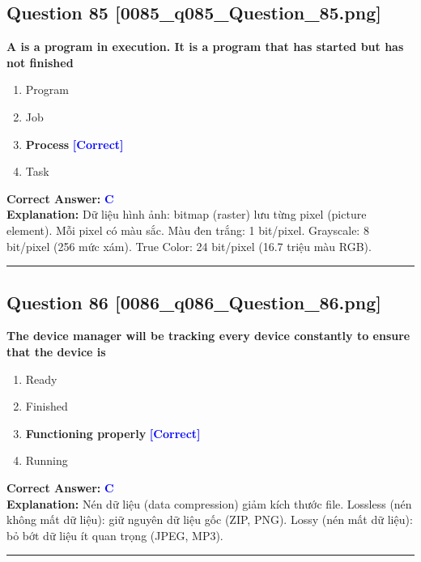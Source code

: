 \documentclass[11pt,a4paper]{article}
\begin{document}
\begin{minipage}{\textwidth}
\subsection*{Question 85 \quad \footnotesize{[0085\_q085\_Question\_85.png]}}
\noindent \textbf{A is a program in execution. It is a program that has started but has not finished}

\begin{enumerate}[label=\Alph*.]
    \item Program
    \item Job
    \item \textbf{Process} \hfill \textcolor{blue}{\textbf{[Correct]}}
    \item Task
\end{enumerate}

\noindent \textbf{Correct Answer:} \textcolor{blue}{\textbf{C}} \\[2pt]
\noindent \textbf{Explanation:} Dữ liệu hình ảnh: bitmap (raster) lưu từng pixel (picture element). Mỗi pixel có màu sắc. Màu đen trắng: 1 bit/pixel. Grayscale: 8 bit/pixel (256 mức xám). True Color: 24 bit/pixel (16.7 triệu màu RGB).

\par\vspace{0.3cm}
\hrule
\vspace{0.3cm}
\end{minipage}

\begin{minipage}{\textwidth}
\subsection*{Question 86 \quad \footnotesize{[0086\_q086\_Question\_86.png]}}
\noindent \textbf{The device manager will be tracking every device constantly to ensure that the device is}

\begin{enumerate}[label=\Alph*.]
    \item Ready
    \item Finished
    \item \textbf{Functioning properly} \hfill \textcolor{blue}{\textbf{[Correct]}}
    \item Running
\end{enumerate}

\noindent \textbf{Correct Answer:} \textcolor{blue}{\textbf{C}} \\[2pt]
\noindent \textbf{Explanation:} Nén dữ liệu (data compression) giảm kích thước file. Lossless (nén không mất dữ liệu): giữ nguyên dữ liệu gốc (ZIP, PNG). Lossy (nén mất dữ liệu): bỏ bớt dữ liệu ít quan trọng (JPEG, MP3).

\par\vspace{0.3cm}
\hrule
\vspace{0.3cm}
\end{minipage}
\end{document}
